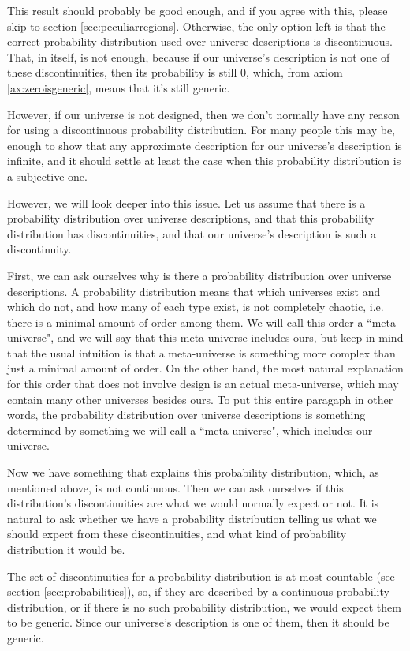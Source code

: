 \documentclass[a4paper
,draft
]{article}
\newcommand{\ghilimele}[1]{``#1"}
\begin{document}
This result should probably be good enough, and if you agree with
this, please skip to section \ref{sec:peculiarregions}.
Otherwise, the only option left is that the correct probability
distribution used over universe descriptions is discontinuous.
That, in itself, is not enough, because if our universe's description is not
one of these discontinuities, then its probability is still $0$, which,
from axiom \ref{ax:zeroisgeneric}, means that it's still generic.

However, if our universe is not designed, then we don't normally have any
reason for using a discontinuous probability distribution.
For many people this may be, enough to
show that any approximate description for our universe's description is
infinite, and it should settle at least the case when this probability
distribution is a subjective one.

However, we will look deeper into this issue.
Let us assume that there is a probability distribution over universe
descriptions, and that this probability distribution has discontinuities,
and that our universe's description is such a discontinuity.

First, we can ask ourselves why is there a probability distribution over
universe descriptions.
A probability distribution means that which universes exist and which do not,
and how many of each type exist, is not completely chaotic,
i.e. there is a minimal amount of order among them.
We will call this order a \ghilimele{meta-universe}, and we will say that
this meta-universe includes ours, but keep in mind that the usual intuition
is that a meta-universe is something more complex than just
a minimal amount of order.
On the other hand, the most natural explanation for this order
that does not involve design is an actual
meta-universe, which may contain many other universes besides ours.
To put this entire paragaph in other words, the probability distribution over
universe descriptions is something determined by something we will call
a \ghilimele{meta-universe}, which includes our universe.

Now we have something that explains this probability distribution, which,
as mentioned above, is not continuous.
Then we can ask ourselves if this distribution's discontinuities are what
we would normally expect or not.
It is natural to ask whether we have a probability distribution telling us
what we should expect from these discontinuities, and what kind of probability
distribution it would be.

The set of discontinuities for a probability distribution is at most countable
(see section \ref{sec:probabilities}), so, if they are described by a
continuous probability
distribution, or if there is no such probability distribution, we would
expect them to be generic.
Since our universe's description is one of them, then it should be generic.
\end{document}
